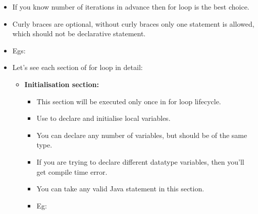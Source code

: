 \setlength{\columnsep}{3pt}
\begin{flushleft}

	\begin{itemize}
		\item If you know number of iterations in advance then for loop is the best choice. 
		
		\item Curly braces are optional, without curly braces only one statement is allowed, which should not be declarative statement.
		
		\item Egs:
		\bigskip
		\bigskip
		\bigskip
		\item Let's see each section of for loop in detail:
		\begin{itemize}
			\item \textbf{Initialisation section:}
			\begin{itemize}
				\item This section will be executed only once in for loop lifecycle.
				\item Use to declare and initialise local variables.
				\item You can declare any number of variables, but should be of the same type. \item If you are trying to declare different datatype variables, then you'll get compile time error.
				\bigskip
				
				\item You can take any valid Java statement in this section.
				\item Eg:
				\bigskip
				\bigskip
			\end{itemize}
		

\end{itemize}
\end{itemize}
\end{flushleft}
